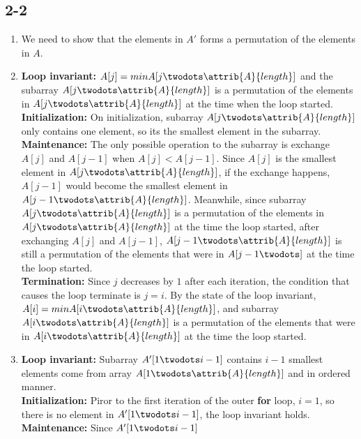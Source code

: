 \subsection{2-2}
\begin{enumerate}[leftmargin=*]
	\item We need to show that the elements in $A'$ forms a permutation
		of the elements in $A$.
	\item \textbf{Loop invariant:} $A[j]=min{A[j\twodots \attrib{A}{length}]}$
		and the subarray $A[j\twodots \attrib{A}{length}]$ is
		a permutation of the elements in $A[j\twodots \attrib
		{A}{length}]$ at the time when the loop started.\\
		\textbf{Initialization:} On initialization, subarray
		$A[j\twodots \attrib{A}{length}]$ only contains one
		element, so its the smallest element in the subarray.\\
		\textbf{Maintenance:} The only possible operation to
		the subarray is exchange $A[j]$ and $A[j-1]$ when
		$A[j]<A[j-1]$. Since $A[j]$ is the smallest element
		in $A[j\twodots \attrib{A}{length}]$, if the exchange
		happens, $A[j-1]$ would become the smallest element
		in $A[j-1\twodots \attrib{A}{length}]$. Meanwhile,
		since subarray $A[j\twodots \attrib{A}{length}]$
		is a permutation of the elements in
		$A[j\twodots \attrib{A}{length}]$ at the time the
		loop started, after exchanging $A[j]$ and $A[j-1]$,
		$A[j-1\twodots \attrib{A}{length}]$ is still a
		permutation of the elements that were in $A[j-1\twodots]$
		at the time the loop started.\\
		\textbf{Termination:} Since $j$ decreases by $1$
		after each iteration, the condition that causes
		the loop terminate is $j=i$. By the state of the
		loop invariant, $A[i]=min{A[i\twodots \attrib
		{A}{length}]}$, and subarray
		$A[i\twodots \attrib{A}{length}]$ is a permutation
		of the elements that were in $A[i\twodots \attrib
		{A}{length}]$ at the time the loop started.
	\item \textbf{Loop invariant:} Subarray $A'[1\twodots i-1]$
		contains $i-1$ smallest elements come from
		array $A[1\twodots \attrib{A}{length}]$ and in
		ordered manner.\\
		\textbf{Initialization:} Piror to the first
		iteration of the outer \textbf{for} loop,
		$i=1$, so there is no element in $A'[1\twodots i-1]$,
		the loop invariant holds.\\
		\textbf{Maintenance:} Since $A'[1\twodots i-1]$

\end{enumerate}
